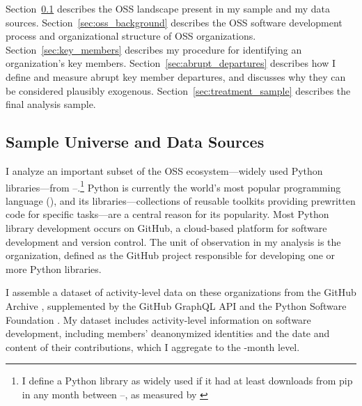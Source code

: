 \documentclass[12pt,notitlepage]{article}
\begin{document}
Section~\ref{sec:oss_universe} describes the OSS landscape present in my sample and my data sources. 
Section~\ref{sec:oss_background} describes the OSS software development process and organizational structure of OSS organizations.
Section~\ref{sec:key_members} describes my procedure for identifying an organization's key members. 
Section~\ref{sec:abrupt_departures} describes how I define and measure abrupt key member departures, and discusses why they can be considered plausibly exogenous. 
Section~\ref{sec:treatment_sample} describes the final analysis sample. 

\subsection{Sample Universe and Data Sources} \label{sec:oss_universe}
I analyze an important subset of the OSS ecosystem---widely used Python libraries---from \SampleStart--\SampleEnd.\footnote{I define a Python library as widely used if it had at least \PipMinMonthlyDownloads{} downloads from pip in any month between \SampleStart--\SampleEnd, as measured by \cite{the_python_software_foundation_pypi_2025}}
Python is currently the world’s most popular programming language (\citealt{paul_jansen_tiobe_2025}), and its libraries—collections of reusable toolkits providing prewritten code for specific tasks—are a central reason for its popularity.
Most Python library development occurs on GitHub, a cloud-based platform for software development and version control.
The unit of observation in my analysis is the organization, defined as the GitHub project responsible for developing one or more Python libraries.

I assemble a dataset of activity-level data on these organizations from the GitHub Archive \citep{GitHub_archive_GitHub_2025}, supplemented by the GitHub GraphQL API \citep{github_graphql} and the Python Software Foundation \citep{the_python_software_foundation_pypi_2025}.
My dataset includes activity-level information on software development, including members’ deanonymized identities and the date and content of their contributions, which I aggregate to the \TimePeriodWord{}-month level.
\end{document}
